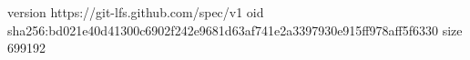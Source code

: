 version https://git-lfs.github.com/spec/v1
oid sha256:bd021e40d41300c6902f242e9681d63af741e2a3397930e915ff978aff5f6330
size 699192
